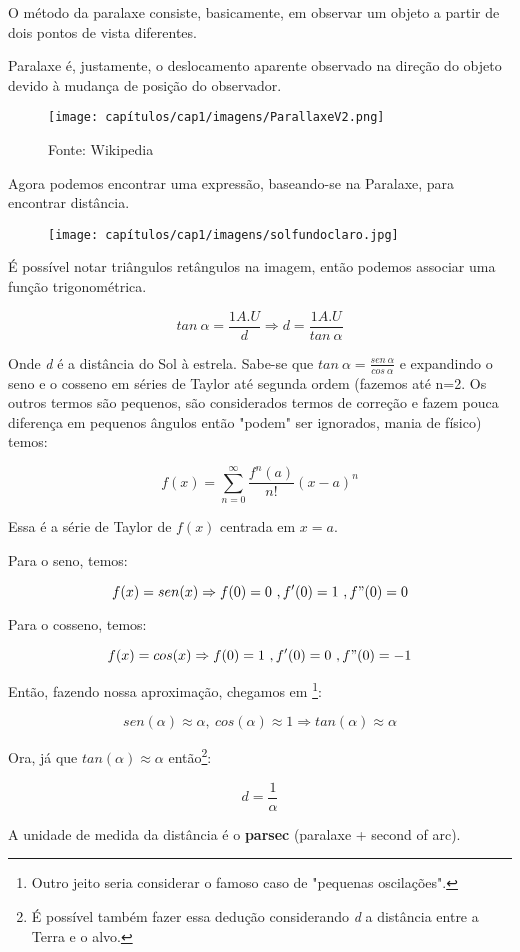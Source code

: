 O método da paralaxe consiste, basicamente, em observar um objeto a partir de dois pontos de vista diferentes.

Paralaxe é, justamente, o deslocamento aparente observado na direção do objeto devido à mudança de posição do observador.

\begin{figure}[!htb]
    \centering
    \texttt{[image: capítulos/cap1/imagens/ParallaxeV2.png]}
    \caption{Fonte: Wikipedia}
    \label{fig:my_label}
\end{figure}

Agora podemos encontrar uma expressão, baseando-se na Paralaxe, para encontrar distância.

\begin{figure}[!htb]
   \centering
   \texttt{[image: capítulos/cap1/imagens/solfundoclaro.jpg]}
\end{figure}
\newpage
É possível notar triângulos retângulos na imagem, então podemos associar uma função trigonométrica.

$$tan \ \alpha = \frac{1 A.U}{d} \Rightarrow d = \frac{1 A.U}{tan \ \alpha} $$

Onde \textit{d} é a distância do Sol à estrela. Sabe-se que $tan \ \alpha = \frac{sen \ \alpha}{cos \ \alpha}$ e expandindo o seno e o cosseno em séries de Taylor até segunda ordem (fazemos até n=2. Os outros termos são pequenos, são considerados termos de correção e fazem pouca diferença em pequenos ângulos então "podem" ser ignorados, mania de físico) temos:

$$f(x) = \sum_{n=0}^{\infty} \frac{f^{n}(a)}{n!}(x-a)^n$$

Essa é a série de Taylor de $f(x)$ centrada em $x=a$.

Para o seno, temos:

$$f(x) = sen(x) \Rightarrow f(0) = 0 \ ,  f'(0) = 1 \ , f"(0) = 0$$

Para o cosseno, temos:

$$f(x) = cos(x) \Rightarrow f(0) = 1 \ ,  f'(0) = 0 \ , f"(0) = -1$$

Então, fazendo nossa aproximação, chegamos em \footnote{Outro jeito seria considerar o famoso caso de "pequenas oscilações".}:

$$sen(\alpha) \approx \alpha , \ cos(\alpha) \approx 1 \Rightarrow tan(\alpha) \approx \alpha$$


Ora, já que $tan(\alpha) \approx \alpha$ então\footnote{É possível também fazer essa dedução considerando \textit{d} a distância entre a Terra e o alvo.}:

\begin{equation}
    d = \frac{1}{\alpha}
    \label{distância}
\end{equation}

A unidade de medida da distância é o \textbf{parsec} (paralaxe + second of arc).




